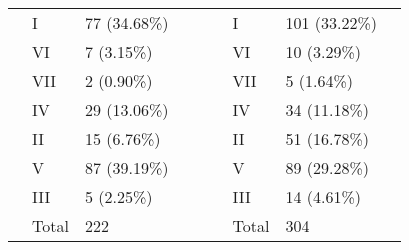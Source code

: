 \begin{table}[]
{\begin{tabular}{|l|l|l|l|l|l|l|l|l|}
 & I & 77 (34.68\%) &  &  &  & I & 101 (33.22\%) &  \\ \cline{2-3} \cline{7-8}
 & VI & 7 (3.15\%) &  &  &  & VI & 10 (3.29\%) &  \\ \cline{2-3} \cline{7-8}
 & VII & 2 (0.90\%) &  &  &  & VII & 5 (1.64\%) &  \\ \cline{2-3} \cline{7-8}
 & IV & 29 (13.06\%) &  &  &  & IV & 34 (11.18\%) &  \\ \cline{2-3} \cline{7-8}
 & II & 15 (6.76\%) &  &  &  & II & 51 (16.78\%) &  \\ \cline{2-3} \cline{7-8}
 & V & 87 (39.19\%) &  &  &  & V & 89 (29.28\%) &  \\ \cline{2-3} \cline{7-8}
 & III & 5 (2.25\%) &  &  &  & III & 14 (4.61\%) &  \\ \cline{2-3} \cline{7-8}
 & Total & 222 &  &  &  & Total & 304 &  \\ \cline{1-4} \cline{6-9}
\end{tabular}
}
\label{table:chord_distribs2}
\end{table}


